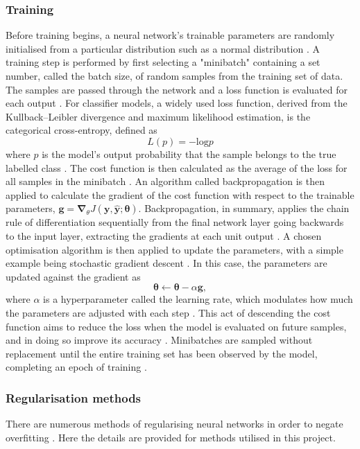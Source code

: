 \documentclass[12pt]{article}
\begin{document}
\subsubsection{Training}
Before training begins, a neural network's trainable parameters are randomly initialised from a particular distribution such as a normal distribution \cite{Goodfellow16}. A training step is performed by first selecting a "minibatch" containing a set number, called the batch size, of random samples from the training set of data. The samples are passed through the network and a loss function is evaluated for each output \cite{Goodfellow16}. For classifier models, a widely used loss function, derived from the Kullback–Leibler divergence and maximum likelihood estimation, is the categorical cross-entropy, defined as
\begin{equation}
L(p)=-\mathrm{log}p
\end{equation}
where $p$ is the model's output probability that the sample belongs to the true labelled class \cite{Kline05}. The cost function is then calculated as the average of the loss for all samples in the minibatch \cite{Goodfellow16}. An algorithm called backpropagation is then applied to calculate the gradient of the cost function with respect to the trainable parameters, $\bm{g}=\bm{\nabla}_{\theta}J(\bm{y},\hat{\bm{y}};\bm{\theta})$. Backpropagation, in summary, applies the chain rule of differentiation sequentially from the final network layer going backwards to the input layer, extracting the gradients at each unit output \cite{Goodfellow16, Amari93}. A chosen optimisation algorithm is then applied to update the parameters, with a simple example being stochastic gradient descent \cite{Goodfellow16}. In this case, the parameters are updated against the gradient as
\begin{equation}
\bm{\theta}\leftarrow\bm{\theta}-\alpha\bm{g},
\end{equation}
where $\alpha$ is a hyperparameter called the learning rate, which modulates how much the parameters are adjusted with each step \cite{Amari93}. This act of descending the cost function aims to reduce the loss when the model is evaluated on future samples, and in doing so improve its accuracy \cite{Goodfellow16}. Minibatches are sampled without replacement until the entire training set has been observed by the model, completing an epoch of training \cite{Goodfellow16}.

\subsubsection{Regularisation methods}
There are numerous methods of regularising neural networks in order to negate overfitting \cite{Goodfellow16}. Here the details are provided for methods utilised in this project.
\end{document}
